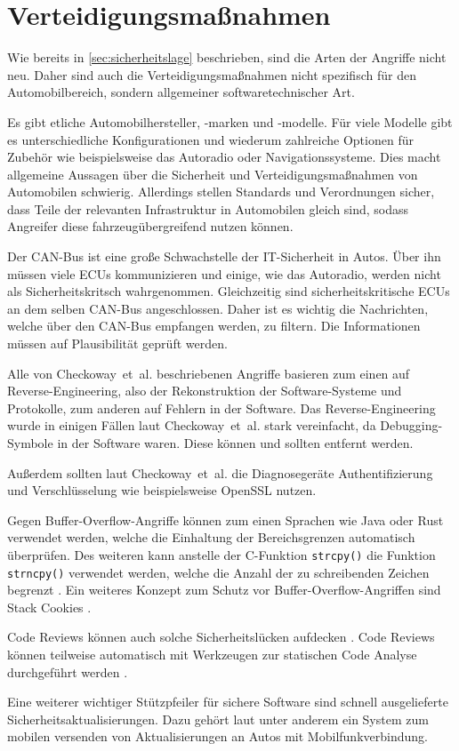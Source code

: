 \chapter{Verteidigungsmaßnahmen}\label{ch:defense}
Wie bereits in \cref{sec:sicherheitslage} beschrieben, sind die Arten der
Angriffe nicht neu. Daher sind auch die Verteidigungsmaßnahmen nicht
spezifisch für den Automobilbereich, sondern allgemeiner softwaretechnischer
Art.

Es gibt etliche Automobilhersteller, -marken und -modelle. Für viele Modelle
gibt es unterschiedliche Konfigurationen und wiederum zahlreiche Optionen für
Zubehör wie beispielsweise das Autoradio oder Navigationssysteme. Dies macht
allgemeine Aussagen über die Sicherheit und Verteidigungsmaßnahmen von
Automobilen schwierig. Allerdings stellen Standards und Verordnungen sicher,
dass Teile der relevanten Infrastruktur in Automobilen gleich sind, sodass
Angreifer diese fahrzeugübergreifend nutzen können.

Der CAN-Bus ist eine große Schwachstelle der IT-Sicherheit in Autos. Über ihn
müssen viele ECUs kommunizieren und einige, wie das Autoradio, werden nicht als
Sicherheitskritsch wahrgenommen. Gleichzeitig sind sicherheitskritische ECUs an
dem selben CAN-Bus angeschlossen. Daher ist es wichtig die Nachrichten, welche
über den CAN-Bus empfangen werden, zu filtern. Die Informationen müssen auf
Plausibilität geprüft werden.

Alle von Checkoway~et~al. beschriebenen Angriffe basieren zum einen auf
Reverse-Engineering, also der Rekonstruktion der Software-Systeme und
Protokolle, zum anderen auf Fehlern in der Software. Das Reverse-Engineering
wurde in einigen Fällen laut Checkoway~et~al. stark vereinfacht, da
Debugging-Symbole in der Software waren. Diese können und sollten
entfernt werden.

Außerdem sollten laut Checkoway~et~al. die Diagnosegeräte Authentifizierung und
Verschlüsselung wie beispielsweise OpenSSL nutzen.

Gegen Buffer-Overflow-Angriffe können zum einen Sprachen wie Java oder Rust
verwendet werden, welche die Einhaltung der Bereichsgrenzen automatisch
überprüfen. Des weiteren kann anstelle der C-Funktion \verb+strcpy()+ die
Funktion \verb+strncpy()+ verwendet werden, welche die Anzahl der zu
schreibenden Zeichen begrenzt \cite{Eckert2012}. Ein weiteres Konzept zum
Schutz vor Buffer-Overflow-Angriffen sind Stack Cookies \cite{Bray2002}.

Code Reviews können auch solche Sicherheitslücken aufdecken \cite{Howard2006}.
Code Reviews können teilweise automatisch mit Werkzeugen zur statischen Code
Analyse durchgeführt werden \cite{McGraw2008}.

Eine weiterer wichtiger Stützpfeiler für sichere Software sind schnell
ausgelieferte Sicherheitsaktualisierungen. Dazu gehört laut \cite{Mahaffey2015}
unter anderem ein System zum mobilen versenden von Aktualisierungen an Autos
mit Mobilfunkverbindung.